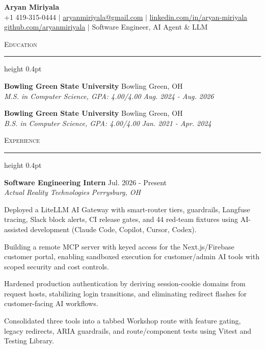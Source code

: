 \documentclass[letterpaper,11pt]{article}
\newcommand{\resumesection}[1]{%
  \par\vspace{2pt}%
  {\large\scshape #1}\par\vspace{2pt}%
  \hrule height 0.4pt\vspace{2pt}%
}
\newcommand{\resumeSubheading}[4]{
  \textbf{#1} \hfill #2\\
  \textit{#3} \hfill \textit{#4}
}
\begin{document}
\begin{center}
  {\LARGE \textbf{Aryan Miriyala}}\\[2pt]
  \small
  +1 419-315-0444 $|$ \href{mailto:aryanmiriyala@gmail.com}{aryanmiriyala@gmail.com} $|$ \href{https://www.linkedin.com/in/aryan-miriyala-7788a21b6/}{linkedin.com/in/aryan-miriyala}\\
  \href{https://github.com/aryanmiriyala}{github.com/aryanmiriyala} $|$ Software Engineer, AI Agent \& LLM
\end{center}\vspace{-6pt}

\resumesection{Education}
\resumeSubheading
{Bowling Green State University}{Bowling Green, OH}
{M.S. in Computer Science, GPA: 4.00/4.00}{Aug. 2024 - Aug. 2026}

\resumeSubheading
{Bowling Green State University}{Bowling Green, OH}
{B.S. in Computer Science, GPA: 4.00/4.00}{Jan. 2021 - Apr. 2024}

\resumesection{Experience}
\resumeSubheading
{Software Engineering Intern}{Jul. 2026 - Present}
{Actual Reality Technologies}{Perrysburg, OH}
\begin{tightitemize}
  \item Deployed a LiteLLM AI Gateway with smart-router tiers, guardrails, Langfuse tracing, Slack block alerts, CI release gates, and 44 red-team fixtures using AI-assisted development (Claude Code, Copilot, Cursor, Codex).
  \item Building a remote MCP server with keyed access for the Next.js/Firebase customer portal, enabling sandboxed execution for customer/admin AI tools with scoped security and cost controls.
  \item Hardened production authentication by deriving session-cookie domains from request hosts, stabilizing login transitions, and eliminating redirect flashes for customer-facing AI workflows.
  \item Consolidated three tools into a tabbed Workshop route with feature gating, legacy redirects, ARIA guardrails, and route/component tests using Vitest and Testing Library.
\end{tightitemize}
\end{document}
